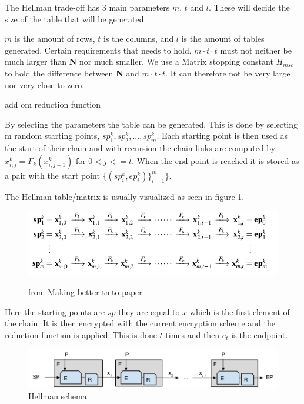 The Hellman trade-off has 3 main parameters $m$, $t$ and $l$. These will
decide the size of the table that will be generated.

$m$ is the amount of rows, $t$ is the columns, and $l$ is the amount
of tables generated.
Certain requirements that needs to hold, $m\cdot t\cdot t$ must not
neither be much larger than \textbf{N} nor much smaller. We use a
Matrix stopping constant $H_{msc}$ to hold the difference between
\textbf{N} and $m\cdot t\cdot t$. It can therefore not be very large
nor very close to zero.


add om reduction function

By selecting the parameters the table can be generated. This is done
by selecting m random starting points,
$sp^{k}_1,sp^{k}_2,...,sp^{k}_m$. Each starting point is then used as
the start of their chain and with recursion the chain links are
computed by $ x^{k}_{i,j}=F_k( x^{k}_{i,j-1})$ for $0<j<=t$. When the
end point is reached it is stored as a pair with the start point
$\{(sp^{k}_{i}, ep^{k}_{i})\}^{m}_{i=1}\}$.

The Hellman table/matrix is usually visualized as seen in figure \ref{fig:hellmax}.
\begin{figure}[th]
  \caption{from Making better tmto paper}
  \includegraphics[width=\textwidth]{figures/HellmanMatrix.png}
  \centering
  \label{fig:hellmax}
\end{figure}

Here the starting points are $sp$ they are equal to $x$ which is the first element of the chain. It is then encrypted with the current encryption scheme and the reduction function is applied. This is done $t$ times and then $e_t$ is the endpoint.

\begin{figure}[th]
  \centering
  \includegraphics[width=\textwidth]{figures/HellSchema.png}
  \caption{Hellman schema}
  \label{fig:hellSchema}
\end{figure}

